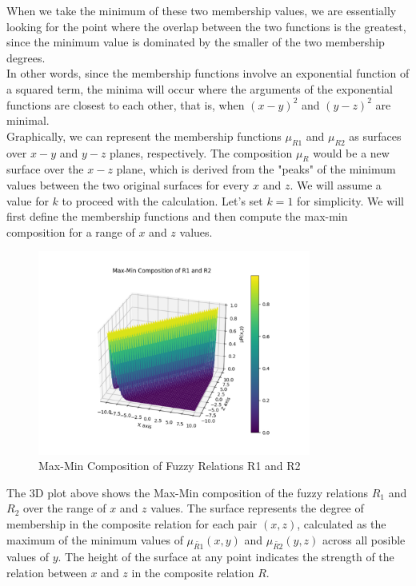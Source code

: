 When we take the minimum of these two membership values, we are essentially looking for the point where the overlap between the two functions is the greatest, since the minimum value is dominated by the smaller of the two membership degrees.
\\

In other words, since the membership functions involve an exponential function of a squared term, the minima will occur where the arguments of the exponential functions are closest to each other, that is, when $(x-y)^2$ and $(y-z)^2$
are minimal.
\\

Graphically, we can represent the membership functions $\mu_{R1}$ and $\mu_{R2}$ as surfaces over $x-y$ and $y-z$ planes, respectively. The composition $\mu_R$ would be a new surface over the $x-z$ plane, which is derived from the "peaks" of the minimum values between the two original surfaces for every $x$ and $z$. We will assume a value for $k$ to proceed with the calculation. Let's set $k=1$ for simplicity. We will first define the membership functions and then compute the max-min composition for a range of 
$x$ and 
$z$ values.

\begin{figure}[H]
	\centering
	\includegraphics[width=0.8\textwidth]{../Problem 10/minmax_plot.pdf}
	\caption{Max-Min Composition of Fuzzy Relations R1 and R2}
\end{figure}
The 3D plot above shows the Max-Min composition of the fuzzy relations $R_1$ and $R_2$ over the range of $x$ and $z$ values. The surface represents the degree of membership in the composite relation for each pair $(x, z)$, calculated as the maximum of the minimum values of $\mu_{\tilde{R1}}(x,y)$ and $\mu_{\tilde{R2}}(y,z)$  across all posible values of $y$. The height of the surface at any point indicates the strength of the relation between $x$ and $z$ in the composite relation $R$.